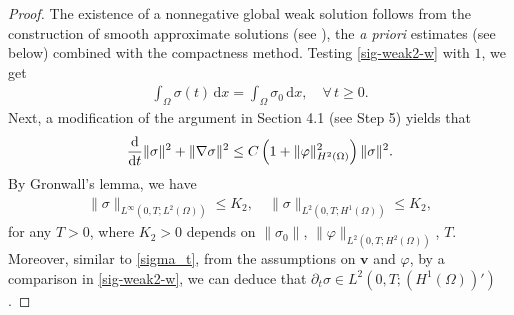 \documentclass[11pt,reqno]{amsart}
\def\d{{\rm d}}
\def\ddt{\frac{\d}{\d t}}
\def\vv{\bm{v}}
\begin{document}
\begin{proof}
The existence of a nonnegative global weak solution follows from the construction  of smooth approximate solutions (see \cite[Lemma 3.1]{GHW1}), the \textit{a priori} estimates (see below) combined with the compactness method.
Testing \eqref{sig-weak2-w} with $1$, we get
\begin{align}
\int_\Omega\sigma(t)\,\mathrm{d}x=\int_\Omega \sigma_0\,\mathrm{d}x,\quad \forall\, t\geq 0.
\label{conv-sig}
\end{align}
Next, a modification of the argument in Section 4.1 (see Step 5) yields that
%
\begin{equation}
\label{sL2-2-b}
  \ddt \|\sigma \|^2 + \|\nabla \sigma \|^2
\leq C \left(1+\|\varphi\|_{H^2(\Omega)}^2 \right) \|\sigma\|^2.
\end{equation}
%
By Gronwall's lemma, we have
%
\begin{align}
\|\sigma\|_{L^\infty(0,T;L^2(\Omega))}\leq K_2,\quad \|\sigma\|_{L^2(0,T;H^1(\Omega))}\leq K_2,
\label{es-sigL2}
\end{align}
%
for any $T>0$, where $K_2>0$ depends on $\|\sigma_0\|$, $\|\varphi\|_{L^2(0,T;H^2(\Omega))}$, $T$. Moreover, similar to \eqref{sigma_t}, from the assumptions on $\vv$ and $\varphi$, by a comparison in \eqref{sig-weak2-w}, we can deduce that $\partial_t\sigma \in L^2(0,T;(H^1(\Omega))')$.


\end{proof}
\end{document}
